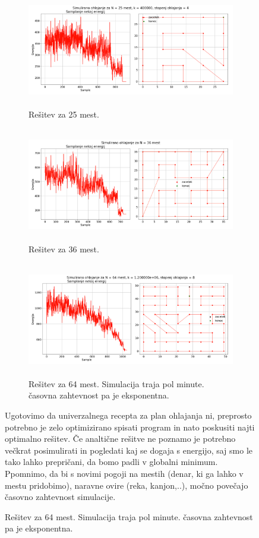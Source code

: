 \documentclass[11pt, a4paper]{article}
\begin{document}
\begin{figure}[H]
 \begin{figure}[H]
\centering
  \includegraphics[width=17cm, height=5cm]{tretja_N25.png}
\caption{Rešitev za 25 mest.}
\end{figure} 

 \begin{figure}[H]
\centering
  \includegraphics[width=17cm, height=5cm]{tretja_N36.png}
\caption{Rešitev za 36 mest.}
\end{figure} 
  \begin{figure}[H]
\centering
  \includegraphics[width=17cm, height=5cm]{tretja_N64.png}
\caption{Rešitev za 64 mest. Simulacija traja pol minute. časovna zahtevnost pa je eksponentna.}


\end{figure} 
Ugotovimo da univerzalnega recepta za plan ohlajanja ni, preprosto potrebno je zelo optimizirano spisati program in nato poskusiti najti optimalno rešitev. Če analtične rešitve ne poznamo je potrebno večkrat posimulirati in pogledati kaj se dogaja s energijo, saj smo le tako lahko prepričani, da bomo padli v globalni minimum.\newline\newline
Ppomnimo, da bi s novimi pogoji na mestih (denar, ki ga lahko v mestu pridobimo),  naravne ovire (reka, kanjon,..), močno povečajo časovno zahtevnost simulacije. 
\fi

\end{figure}
\end{document}
